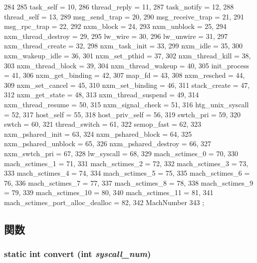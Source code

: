 \begin{DoxyCode}
284          {
285         task_self = 10,
286         thread_reply = 11,
287         task_notify = 12,
288         thread_self = 13,
289         msg_send_trap = 20,
290         msg_receive_trap = 21,
291         msg_rpc_trap = 22,
292         nxm_block = 24,
293         nxm_unblock = 25,
294         nxm_thread_destroy = 29,
295         lw_wire = 30,
296         lw_unwire = 31,
297         nxm_thread_create = 32,
298         nxm_task_init = 33,
299         nxm_idle = 35,
300         nxm_wakeup_idle = 36,
301         nxm_set_pthid = 37,
302         nxm_thread_kill = 38,
303         nxm_thread_block = 39,
304         nxm_thread_wakeup = 40,
305         init_process = 41,
306         nxm_get_binding = 42,
307         map_fd = 43,
308         nxm_resched = 44,
309         nxm_set_cancel = 45,
310         nxm_set_binding = 46,
311         stack_create = 47,
312         nxm_get_state = 48,
313         nxm_thread_suspend = 49,
314         nxm_thread_resume = 50,
315         nxm_signal_check = 51,
316         htg_unix_syscall = 52,
317         host_self = 55,
318         host_priv_self = 56,
319         swtch_pri = 59,
320         swtch = 60,
321         thread_switch = 61,
322         semop_fast = 62,
323         nxm_pshared_init = 63,
324         nxm_pshared_block = 64,
325         nxm_pshared_unblock = 65,
326         nxm_pshared_destroy = 66,
327         nxm_swtch_pri = 67,
328         lw_syscall = 68,
329         mach_sctimes_0 = 70,
330         mach_sctimes_1 = 71,
331         mach_sctimes_2 = 72,
332         mach_sctimes_3 = 73,
333         mach_sctimes_4 = 74,
334         mach_sctimes_5 = 75,
335         mach_sctimes_6 = 76,
336         mach_sctimes_7 = 77,
337         mach_sctimes_8 = 78,
338         mach_sctimes_9 = 79,
339         mach_sctimes_10 = 80,
340         mach_sctimes_11 = 81,
341         mach_sctimes_port_alloc_dealloc = 82,
342         MachNumber
343     };
\end{DoxyCode}


\subsection{関数}
\hypertarget{classSystemCalls_3_01Tru64_01_4_a24f086060347dbac9793f83042198f5f}{
\subsubsection[{convert}]{\setlength{\rightskip}{0pt plus 5cm}static int convert (int {\em syscall\_\-num})}}
\label{classSystemCalls_3_01Tru64_01_4_a24f086060347dbac9793f83042198f5f}



